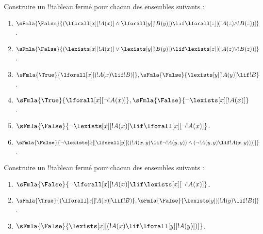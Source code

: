 \documentclass[../../../include/open-logic-section]{subfiles}
\begin{document}
\begin{prob}
Construire un !!{tableau} fermé pour chacun des ensembles suivants :
\begin{enumerate}
\item $\sFmla{\False}{(\lforall[x][!A(x)] \land \lforall[y][!B(y)])
\lif \lforall[z][(!A(z) \land !B(z))]}$.
\item $\sFmla{\False}{(\lexists[x][!A(x)] \lor \lexists[y][!B(y)])
\lif \lexists[z][(!A(z) \lor !B(z))]}$.
\item $\sFmla{\True}{\lforall[x][(!A(x) \lif !B)]},
\sFmla{\False}{\lexists[y][!A(y)] \lif !B}$.
\item $\sFmla{\True}{\lforall[x][\lnot !A(x)]},
\sFmla{\False}{\lnot\lexists[x][!A(x)]}$.
\item $\sFmla{\False}{\lnot\lexists[x][!A(x)] \lif \lforall[x][\lnot
!A(x)]}$.
\item $\sFmla{\False}{\lnot\lexists[x][\lforall[y][((!A(x,y) \lif
\lnot !A(y,y)) \land (\lnot !A(y,y) \lif !A(x,y)))]]}$.
\end{enumerate}
\end{prob}

\begin{prob}
Construire un !!{tableau} fermé pour chacun des ensembles suivants :
\begin{enumerate}
\item $\sFmla{\False}{\lnot\lforall[x][!A(x)] \lif \lexists[x][\lnot!A(x)]}$.
\item $\sFmla{\True}{(\lforall[x][!A(x)] \lif !B)}, \sFmla{\False}{\lexists[y][(!A(y) \lif !B)]}$.
\item $\sFmla{\False}{\lexists[x][(!A(x) \lif \lforall[y][!A(y)])]}$.
\end{enumerate}
\end{prob}
\end{document}
